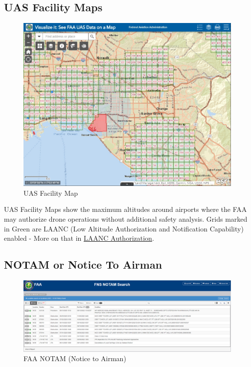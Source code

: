 \documentclass[
  12pt,
]{book}
\begin{document}
\hypertarget{uas-facility-maps}{%
\subsection{UAS Facility Maps}\label{uas-facility-maps}}

\begin{figure}

{\centering \includegraphics[width=0.9\linewidth]{images/facility-map} 

}

\caption{UAS Facility Map}\label{fig:facility-map}
\end{figure}

UAS Facility Maps show the maximum altitudes around airports where the FAA may authorize drone operations without additional safety analysis. Grids marked in Green are LAANC (Low Altitude Authorization and Notification Capability) enabled - More on that in \protect\hyperlink{ch-LAANC}{LAANC Authorization}.

\hypertarget{notam-or-notice-to-airman}{%
\subsection{NOTAM or Notice To Airman}\label{notam-or-notice-to-airman}}

\begin{figure}
\centering
\includegraphics{images/FAA-Notam.png}
\caption{FAA NOTAM (Notice to Airman)}
\end{figure}
\end{document}
